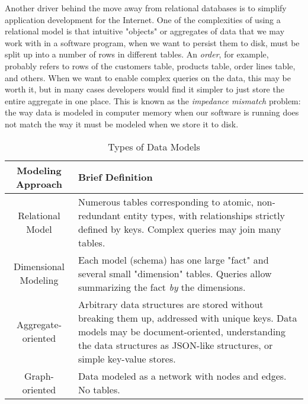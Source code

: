 \documentclass[11pt]{book}
\newcommand{\term}[1]{\emph{#1}} %
\newcommand{\head}[1]{\textnormal{\textbf{#1}}} %
\begin{document}
Another driver behind the move away from relational databases is to simplify application development for the Internet.  One of the complexities of using a relational model is that intuitive "objects" or aggregates of data that we may work with in a software program, when we want to persist them to disk, must be split up into a number of rows in different tables.  An \emph{order}, for example, probably refers to rows of the customers table, products table, order lines table, and others.  When we want to enable complex queries on the data, this may be worth it, but in many cases developers would find it simpler to just store the entire aggregate in one place.  This is known as the \term{impedance mismatch} problem: the way data is modeled in computer memory when our software is running does not match the way it must be modeled when we store it to disk.

\begin{table}
\centering
\caption{Types of Data Models}
\vspace{10pt}
\begin{tabular}{cp{8cm}}
    \toprule[1.5pt]
    \head{Modeling Approach} & \head{Brief Definition} \\
    \midrule
    Relational Model & Numerous tables corresponding to atomic, non-redundant entity types, with relationships strictly defined by keys. Complex queries may join many tables.\\
    \midrule
    Dimensional Modeling & Each model (schema) has one large "fact" and several small "dimension" tables. Queries allow summarizing the fact \emph{by} the dimensions.\\
    \midrule
    Aggregate-oriented & Arbitrary data structures are stored without breaking them up, addressed with unique keys. Data models may be document-oriented, understanding the data structures as JSON-like structures, or simple key-value stores. \\
    \midrule
    Graph-oriented & Data modeled as a network with nodes and edges. No tables. \\
    \bottomrule[1.5pt]
\end{tabular}
\end{table}
\end{document}
